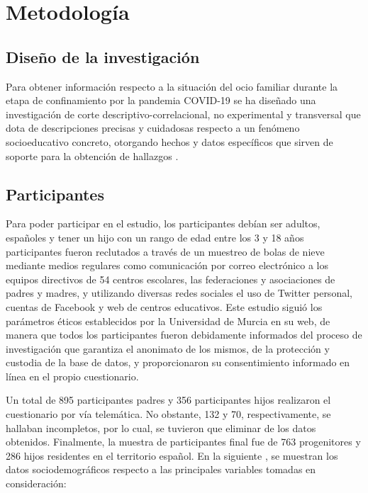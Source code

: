 \documentclass{textolivre}
\begin{document}
\section{Metodología}
\subsection{Diseño de la investigación}
Para obtener información respecto a la situación del ocio familiar durante la etapa de confinamiento por la pandemia COVID-19 se ha diseñado una investigación de corte descriptivo-correlacional, no experimental y transversal que dota de descripciones precisas y cuidadosas respecto a un fenómeno socioeducativo concreto, otorgando hechos y datos específicos que sirven de soporte para la obtención de hallazgos \cite{bisquerra2004}. 

\subsection{Participantes}
Para poder participar en el estudio, los participantes debían ser adultos, españoles y tener un hijo con un rango de edad entre los 3 y 18 años participantes fueron reclutados a través de un muestreo de bolas de nieve mediante medios regulares como comunicación por correo electrónico a los equipos directivos de 54 centros escolares, las federaciones y asociaciones de padres y madres, y utilizando diversas redes sociales  el uso de Twitter personal, cuentas de Facebook y web de centros educativos. Este estudio siguió los parámetros éticos establecidos por la Universidad de Murcia en su web, de manera que todos los participantes fueron debidamente informados del proceso de investigación que garantiza el anonimato de los mismos, de la protección y custodia de la base de datos, y proporcionaron su consentimiento informado en línea en el propio cuestionario.

Un total de 895 participantes padres y 356 participantes hijos realizaron el cuestionario por vía telemática. No obstante, 132 y 70, respectivamente, se hallaban incompletos, por lo cual, se tuvieron que eliminar de los datos obtenidos. Finalmente, la muestra de participantes final fue de 763 progenitores y 286 hijos residentes en el territorio español. En la siguiente , se muestran los datos sociodemográficos respecto a las principales variables tomadas en consideración: 
\end{document}
